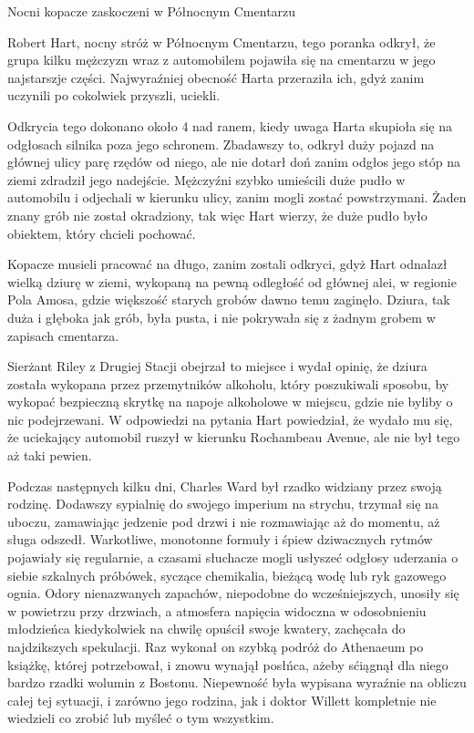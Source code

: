 \begin{displayquote}

Nocni kopacze zaskoczeni w Północnym Cmentarzu

Robert Hart, nocny stróż w Północnym Cmentarzu, tego poranka odkrył, że grupa kilku mężczyzn wraz z automobilem pojawiła się na cmentarzu w jego najstarszje części. Najwyraźniej obecność Harta przeraziła ich, gdyż zanim uczynili po cokolwiek przyszli, uciekli. 

Odkrycia tego dokonano około 4 nad ranem, kiedy uwaga Harta skupioła się na odgłosach silnika poza jego schronem. Zbadawszy to, odkrył duży pojazd na głównej ulicy parę rzędów od niego, ale nie dotarł doń zanim odgłos jego stóp na ziemi zdradził jego nadejście. Mężczyźni szybko umieścili duże pudło w automobilu i odjechali w kierunku ulicy, zanim mogli zostać powstrzymani. Żaden znany grób nie został okradziony, tak więc Hart wierzy, że duże pudło było obiektem, który chcieli pochować. 

Kopacze musieli pracować na długo, zanim zostali odkryci, gdyż Hart odnalazł wielką dziurę w ziemi, wykopaną na pewną odległość od głównej alei, w regionie Pola Amosa, gdzie większość starych grobów dawno temu zaginęło. Dziura, tak duża i głęboka jak grób, była pusta, i nie pokrywała się z żadnym grobem w zapisach cmentarza. 

Sierżant Riley z Drugiej Stacji obejrzał to miejsce i wydał opinię, że dziura została wykopana przez przemytników alkoholu, który poszukiwali sposobu, by wykopać bezpieczną skrytkę na napoje alkoholowe w miejscu, gdzie nie byliby o nic podejrzewani. W odpowiedzi na pytania Hart powiedział, że wydało mu się, że uciekający automobil ruszył w kierunku Rochambeau Avenue, ale nie był tego aż taki pewien. 

\end{displayquote}

Podczas następnych kilku dni, Charles Ward był rzadko widziany przez swoją rodzinę. Dodawszy sypialnię do swojego imperium na strychu, trzymał się na uboczu, zamawiając jedzenie pod drzwi i nie rozmawiając aż do momentu, aż sługa odszedł. Warkotliwe, monotonne formuły i śpiew dziwacznych rytmów pojawiały się regularnie, a czasami słuchacze mogli usłyszeć odgłosy uderzania o siebie szkalnych próbówek, syczące chemikalia, bieżącą wodę lub ryk gazowego ognia. Odory nienazwanych zapachów, niepodobne do wcześniejszych, unosiły się w powietrzu przy drzwiach, a atmosfera napięcia widoczna w odosobnieniu młodzieńca kiedykolwiek na chwilę opuścił swoje kwatery, zachęcała do najdzikszych spekulacji. Raz wykonał on szybką podróż do Athenaeum po książkę, której potrzebował, i znowu wynajął posłńca, ażeby sćiągnął dla niego bardzo rzadki wolumin z Bostonu. Niepewność była wypisana wyraźnie na obliczu całej tej sytuacji, i zarówno jego rodzina, jak i doktor Willett kompletnie nie wiedzieli co zrobić lub myśleć o tym wszystkim.

